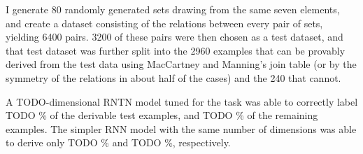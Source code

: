 I generate 80 randomly generated sets drawing from the same seven elements, and create a dataset consisting of the relations between every pair of sets, yielding 6400 pairs. 3200 of these pairs were then chosen as a test dataset, and that test dataset was further split into the 2960 examples that can be provably derived from the test data using MacCartney and Manning's join table (or by the symmetry of the relations in about half of the cases) and the 240 that cannot. %

 A TODO-dimensional RNTN model tuned for the task was able to correctly label TODO \% of the derivable test examples, and TODO \% of the remaining examples. The simpler RNN model with the same number of dimensions was able to derive only TODO \% and TODO \%, respectively.

